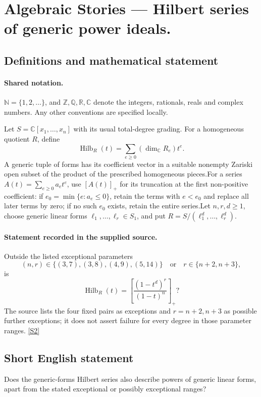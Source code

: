 \documentclass[11pt]{article}
\newcommand{\sref}[2]{\hyperlink{source:#1:#2}{[S#2]}}
\begin{document}
\section{Algebraic Stories — Hilbert series of generic power ideals.}\label{statement}

\subsection{Definitions and mathematical statement}

\paragraph{Shared notation.}$\mathbb N=\{1,2,\ldots\}$, and $\mathbb Z,\mathbb Q,\mathbb R,\mathbb C$ denote the integers, rationals, reals and complex numbers. Any other conventions are specified locally.


Let $S=\mathbb C[x_1,\ldots,x_n]$ with its usual total-degree grading. For a homogeneous quotient $R$, define
\[\operatorname{Hilb}_R(t)=\sum_{e\geq0}(\dim_{\mathbb C}R_e)t^e.
\]
A generic tuple of forms has its coefficient vector in a suitable nonempty Zariski open subset of the product of the prescribed homogeneous pieces.For a series $A(t)=\sum_{e\geq0}a_et^e$, use $[A(t)]_+$ for its truncation at the first non-positive coefficient: if $e_0=\min\{e:a_e\leq0\}$, retain the terms with $e<e_0$ and replace all later terms by zero; if no such $e_0$ exists, retain the entire series.Let $n,r,d\geq1$, choose generic linear forms $\ell_1,\ldots,\ell_r\in S_1$, and put $R=S/(\ell_1^d,\ldots,\ell_r^d)$.
\paragraph{Statement recorded in the supplied source.}
Outside the listed exceptional parameters
\[(n,r)\in\{(3,7),(3,8),(4,9),(5,14)\}\quad\text{or}\quad r\in\{n+2,n+3\},
\]
is
\[\operatorname{Hilb}_R(t)=\left[\frac{(1-t^d)^r}{(1-t)^n}\right]_+?
\]
The source lists the four fixed pairs as exceptions and $r=n+2,n+3$ as possible further exceptions; it does not assert failure for every degree in those parameter ranges. \sref{statement}{2}
\subsection{Short English statement}
Does the generic-forms Hilbert series also describe powers of generic linear forms, apart from the stated exceptional or possibly exceptional ranges?
\end{document}
